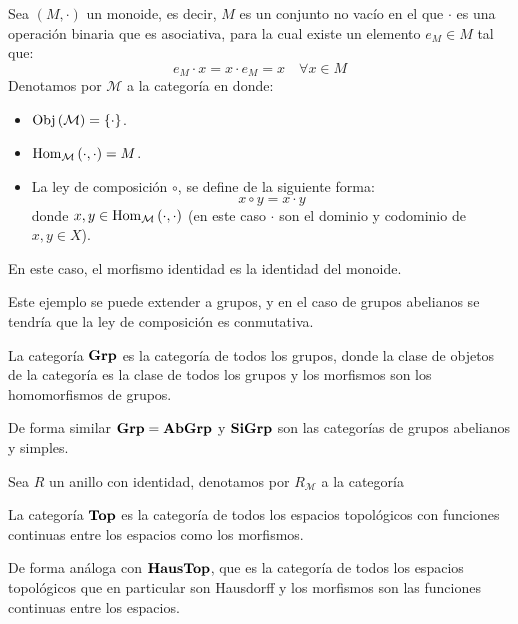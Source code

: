 \documentclass{article}
\newcounter{it}
\theoremstyle{largebreak}
\newcommand{\Obj}[1]{\ensuremath{\textup{Obj}\left(#1\right)}}
\newcommand{\Hom}[3]{\ensuremath{\textup{Hom}_{#1}\left(#2,#3\right)}}
\newcommand{\Cat}[1]{\ensuremath{\textup{\textbf{#1}}}}
\begin{document}
    \begin{exa}
        Sea $(M,\cdot)$ un monoide, es decir, $M$ es un conjunto no vacío en el que $\cdot$ es una operación binaria que es asociativa, para la cual existe un elemento $e_M\in M$ tal que:
        \begin{equation*}
            e_M\cdot x=x\cdot e_M=x\quad\forall x\in M
        \end{equation*}
        Denotamos por $\mathcal{M}$ a la categoría en donde:
        \begin{itemize}
            \item $\Obj{\mathcal{M}}=\left\{\cdot \right\}$.
            \item $\Hom{\mathcal{M}}{\cdot}{\cdot}=M$.
            \item La ley de composición $\circ$, se define de la siguiente forma:
            \begin{equation*}
                x\circ y=x\cdot y
            \end{equation*}
            donde $x,y\in \Hom{\mathcal{M}}{\cdot}{\cdot}$ (en este caso $\cdot$ son el dominio y codominio de $x,y\in X$).
        \end{itemize}
        En este caso, el morfismo identidad es la identidad del monoide.

        Este ejemplo se puede extender a grupos, y en el caso de grupos abelianos se tendría que la ley de composición es conmutativa.
    \end{exa}

    \begin{exa}
        La categoría $\Cat{Grp}$ es la categoría de todos los grupos, donde la clase de objetos de la categoría es la clase de todos los grupos y los morfismos son los homomorfismos de grupos.

        De forma similar $\Cat{Grp}=\Cat{AbGrp}$ y $\Cat{SiGrp}$ son las categorías de grupos abelianos y simples.
    \end{exa}

    \begin{exa}
        Sea $R$ un anillo con identidad, denotamos por $R_\mathcal{M}$ a la categoría
    \end{exa}

    \begin{exa}
        La categoría $\Cat{Top}$ es la categoría de todos los espacios topológicos con funciones continuas entre los espacios como los morfismos.

        De forma análoga con $\Cat{HausTop}$, que es la categoría de todos los espacios topológicos que en particular son Hausdorff y los morfismos son las funciones continuas entre los espacios.
    \end{exa}
\end{document}
